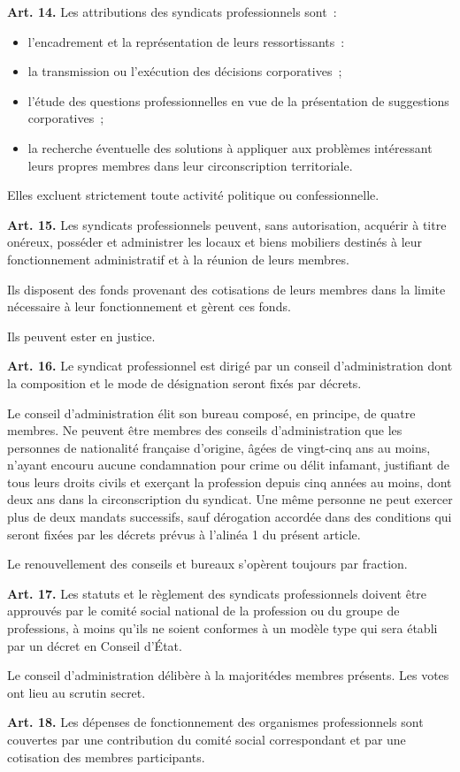 \documentclass[french,twoside]{book} %
\newcommand{\labelchar}[1]{\textbf{\color{rubric} #1}}
\begin{document}
\noindent \labelchar{Art. 14.} Les attributions des syndicats professionnels sont :\par

\begin{itemize}[itemsep=0pt,]
\item l’encadrement et la représentation de leurs ressortissants :
\item la transmission ou l’exécution des décisions corporatives ;
\item l’étude des questions professionnelles en vue de la présentation de suggestions corporatives ;
\item la recherche éventuelle des solutions à appliquer aux problèmes intéressant leurs propres membres dans leur circonscription territoriale.
\end{itemize}
\noindent Elles excluent strictement toute activité politique ou confessionnelle.\par
\bigbreak
\noindent \labelchar{Art. 15.} Les syndicats professionnels peuvent, sans autorisation, acquérir à titre onéreux, posséder et administrer les locaux et biens mobiliers destinés à leur fonctionnement administratif et à la réunion de leurs membres.\par
Ils disposent des fonds provenant des cotisations de leurs membres dans la limite nécessaire à leur fonctionnement et gèrent ces fonds.\par
Ils peuvent ester en justice.\par
\bigbreak
\noindent \labelchar{Art. 16.} Le syndicat professionnel est dirigé par un conseil d’administration dont la composition et le mode de désignation seront fixés par décrets.\par
Le conseil d’administration élit son bureau composé, en principe, de quatre membres. Ne peuvent être membres des conseils d’administration que les personnes de nationalité française d’origine, âgées de vingt-cinq ans au moins, n’ayant encouru aucune condamnation pour crime ou délit infamant, justifiant de tous leurs droits civils et exerçant la profession depuis cinq années au moins, dont deux ans dans la circonscription du syndicat. Une même personne ne peut exercer plus de deux mandats successifs, sauf dérogation accordée dans des conditions qui seront fixées par les décrets prévus à l’alinéa 1 du présent article.\par
Le renouvellement des conseils et bureaux s’opèrent toujours par fraction.\par
\bigbreak
\noindent \labelchar{Art. 17.} Les statuts et le règlement des syndicats professionnels doivent être approuvés par le comité social national de la profession ou du groupe de professions, à moins qu’ils ne soient conformes à un modèle type qui sera établi par un décret en Conseil d’État.\par
Le conseil d’administration délibère à la majoritédes membres présents. Les votes ont lieu au scrutin secret.\par
\bigbreak
\noindent \labelchar{Art. 18.} Les dépenses de fonctionnement des organismes professionnels sont couvertes par une contribution du comité social correspondant et par une cotisation des membres participants.
\end{document}
